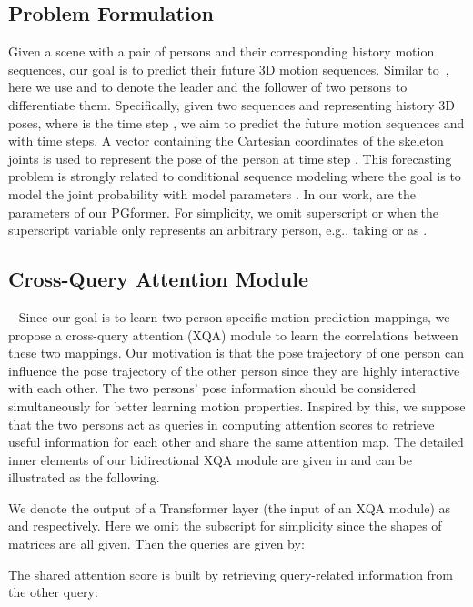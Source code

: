 \documentclass[10pt,twocolumn,letterpaper]{article}
\begin{document}
\subsection{Problem Formulation} 
Given a scene with a pair of persons and their corresponding history motion sequences, our goal is to predict their future 3D motion sequences. 
Similar to~\cite{guo2021multi}, here we use  and  to denote the leader and the follower of two persons to differentiate them. 
Specifically, given two sequences  and  representing history 3D poses, where  is the time step , we aim to predict the future motion sequences  and  with  time steps. 
A vector  containing the Cartesian coordinates of the  skeleton joints is used to represent the pose of the person  at time step . 
This forecasting problem is strongly related to conditional sequence modeling where the goal is to model
the joint probability  with model parameters . 
In our work,  are the parameters of our PGformer.
For simplicity, we omit superscript  or  when the superscript variable only represents an arbitrary person, e.g., taking  or  as .


\subsection{Cross-Query Attention Module}
~\label{subsec:xqa_module}
Since our goal is to learn two person-specific motion prediction mappings, we propose a cross-query attention (XQA) module to learn the correlations between these two mappings.
Our motivation is that the pose trajectory of one person can influence the pose trajectory of the other person since they are highly interactive with each other.
The two persons' pose information should be considered simultaneously for better learning motion properties.
Inspired by this, we suppose that the two persons act as queries in computing attention scores to retrieve useful information for each other and share the same attention map. 
The detailed inner elements of our bidirectional XQA module are given in  and can be illustrated as the following. 

We denote the output of a Transformer layer (the input of an XQA module) as  and  respectively. 
Here we omit the subscript for simplicity since the shapes of matrices are all given. 
Then the queries are given by:
\vskip -0.2in

\vskip -0.05in
The shared attention score is built by retrieving query-related information from the other query: 
\vskip -0.1in
\end{document}
